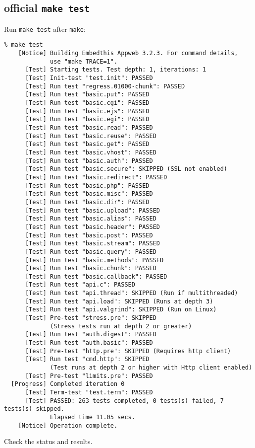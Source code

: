 \documentclass[a4paper]{report}
\begin{document}
\subsection{official {\tt make test}}
Run {\tt make test} after {\tt make}:
\begin{lstlisting}
% make test
    [Notice] Building Embedthis Appweb 3.2.3. For command details, 
             use "make TRACE=1".
      [Test] Starting tests. Test depth: 1, iterations: 1
      [Test] Init-test "test.init": PASSED
      [Test] Run test "regress.01000-chunk": PASSED
      [Test] Run test "basic.put": PASSED
      [Test] Run test "basic.cgi": PASSED
      [Test] Run test "basic.ejs": PASSED
      [Test] Run test "basic.egi": PASSED
      [Test] Run test "basic.read": PASSED
      [Test] Run test "basic.reuse": PASSED
      [Test] Run test "basic.get": PASSED
      [Test] Run test "basic.vhost": PASSED
      [Test] Run test "basic.auth": PASSED
      [Test] Run test "basic.secure": SKIPPED (SSL not enabled)
      [Test] Run test "basic.redirect": PASSED
      [Test] Run test "basic.php": PASSED
      [Test] Run test "basic.misc": PASSED
      [Test] Run test "basic.dir": PASSED
      [Test] Run test "basic.upload": PASSED
      [Test] Run test "basic.alias": PASSED
      [Test] Run test "basic.header": PASSED
      [Test] Run test "basic.post": PASSED
      [Test] Run test "basic.stream": PASSED
      [Test] Run test "basic.query": PASSED
      [Test] Run test "basic.methods": PASSED
      [Test] Run test "basic.chunk": PASSED
      [Test] Run test "basic.callback": PASSED
      [Test] Run test "api.c": PASSED
      [Test] Run test "api.thread": SKIPPED (Run if multithreaded)
      [Test] Run test "api.load": SKIPPED (Runs at depth 3)
      [Test] Run test "api.valgrind": SKIPPED (Run on Linux)
      [Test] Pre-test "stress.pre": SKIPPED 
             (Stress tests run at depth 2 or greater)
      [Test] Run test "auth.digest": PASSED
      [Test] Run test "auth.basic": PASSED
      [Test] Pre-test "http.pre": SKIPPED (Requires http client)
      [Test] Run test "cmd.http": SKIPPED 
             (Test runs at depth 2 or higher with Http client enabled)
      [Test] Pre-test "limits.pre": PASSED
  [Progress] Completed iteration 0
      [Test] Term-test "test.term": PASSED
      [Test] PASSED: 263 tests completed, 0 tests(s) failed, 7 tests(s) skipped. 
             Elapsed time 11.05 secs.
    [Notice] Operation complete.
\end{lstlisting}
Check the status and results.
\end{document}
